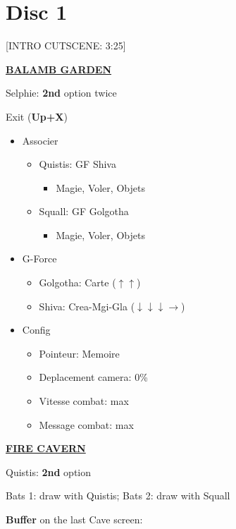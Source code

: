 \chapter{Disc 1}

[INTRO CUTSCENE: 3:25]

\underline{\textbf{BALAMB GARDEN}}

Selphie: \textbf{2nd} option twice

Exit (\textbf{Up+X})

\begin{menu}
	\begin{itemize}
		\item Associer
			\begin{itemize}
				\item Quistis: GF Shiva
					\begin{itemize}
						\item Magie, Voler, Objets
					\end{itemize}
				\item Squall: GF Golgotha
					\begin{itemize}
						\item Magie, Voler, Objets
					\end{itemize}
			\end{itemize}
		\item G-Force
			\begin{itemize}
				\item Golgotha: Carte ($\uparrow\uparrow$)
				\item Shiva: Crea-Mgi-Gla ($\downarrow\downarrow\downarrow\rightarrow$)
			\end{itemize}
		\item Config
			\begin{itemize}
				\item Pointeur: Memoire
				\item Deplacement camera: 0\%
				\item Vitesse combat: max
				\item Message combat: max
			\end{itemize}
	\end{itemize}
\end{menu}

\underline{\textbf{FIRE CAVERN}}

Quistis: \textbf{2nd} option

Bats 1: draw with Quistis; Bats 2: draw with Squall

\textbf{Buffer} on the last Cave screen:

